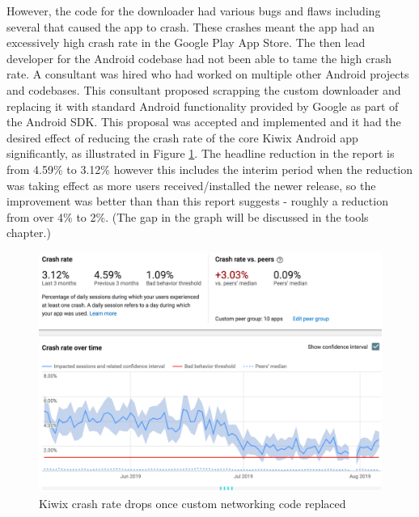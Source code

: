However, the code for the downloader had various bugs and flaws including several that caused the app to crash. These crashes meant the app had an excessively high crash rate in the Google Play App Store. The then lead developer for the Android codebase had not been able to tame the high crash rate. A consultant was hired who had worked on multiple other Android projects and codebases. This consultant proposed scrapping the custom downloader and replacing it with standard Android functionality provided by Google as part of the Android SDK. This proposal was accepted and implemented and it had the desired effect of reducing the crash rate of the core Kiwix Android app significantly, as illustrated in Figure \ref{fig:kiwix-crash-rate-drops-with-v2_5}. The headline reduction in the report is from 4.59\% to 3.12\% however this includes the interim period when the reduction was taking effect as more users received/installed the newer release, so the improvement was better than than this report suggests - roughly a reduction from over 4\% to 2\%. (The gap in the graph will be discussed in the tools chapter.) 

\begin{figure}
    \centering
    \includegraphics[width=\linewidth]{images/android-vitals-screenshots/kiwix/kiwix-crash-rate-drops-with-v2_5.pdf}
    \caption{Kiwix crash rate drops once custom networking code replaced}
    \label{fig:kiwix-crash-rate-drops-with-v2_5}
\end{figure}

